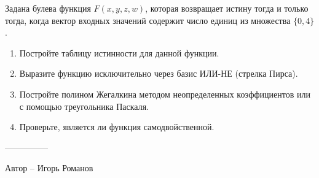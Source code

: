 \question
Задана булева функция $F(x,y,z,w)$, которая возвращает истину тогда и только тогда, когда вектор входных значений содержит число единиц из множества $\{0,4\}$.
\begin{enumerate}
\item Постройте таблицу истинности для данной функции.
\item Выразите функцию исключительно через базис ИЛИ-НЕ (стрелка Пирса).
\item Постройте полином Жегалкина методом неопределенных коэффициентов или с помощью треугольника Паскаля.
\item Проверьте, является ли функция самодвойственной.
\end{enumerate}

---------------

Автор -- Игорь Романов
